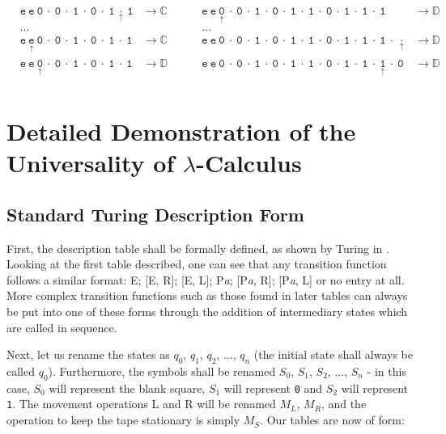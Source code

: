 \documentclass[Master.tex]{subfiles}
\begin{document}
\begin{equation*}
\begin{aligned}
&\mathtt{e\ e\ 0\ \cdot\ 0\ \cdot\ 1\ \cdot\ 0\ \cdot\ 1\ \underset{\uparrow}{\cdot}\ 1} & \rightarrow \mathbb{C}\ \ \ \ \ \ \ \ \ \ & \mathtt{e\ e\ \underset{\uparrow}{0}\ \cdot\ 0\ \cdot\ 1\ \cdot\ 0\ \cdot\ 1\ \cdot\ 1\ \cdot\ 0\ \cdot\ 1\ \cdot\ 1\ \cdot\ 1} & \rightarrow \mathbb{D}\\
&...& &...&\\
&\mathtt{e\ \underset{\uparrow}{e}\ 0\ \cdot\ 0\ \cdot\ 1\ \cdot\ 0\ \cdot\ 1\ \cdot\ 1} & \rightarrow \mathbb{C}\ \ \ \ \ \ \ \ \ \ & \mathtt{e\ e\ 0\ \cdot\ 0\ \cdot\ 1\ \cdot\ 0\ \cdot\ 1\ \cdot\ 1\ \cdot\ 0\ \cdot\ 1\ \cdot\ 1\ \cdot\ 1\ \cdot\ \underset{\uparrow}{\cdot}} & \rightarrow \mathbb{D}\\
&\mathtt{e\ e\ \underset{\uparrow}{0}\ \cdot\ 0\ \cdot\ 1\ \cdot\ 0\ \cdot\ 1\ \cdot\ 1} & \rightarrow \mathbb{D}\ \ \ \ \ \ \ \ \ \ & \mathtt{e\ e\ 0\ \cdot\ 0\ \cdot\ 1\ \cdot\ 0\ \cdot\ 1\ \cdot\ 1\ \cdot\ 0\ \cdot\ 1\ \cdot\ 1\ \cdot\ \underset{\uparrow}{1}\ \cdot\ 0} & \rightarrow \mathbb{D}\\
\end{aligned}
\end{equation*}

\clearpage


\section{Detailed Demonstration of the Universality of $\lambda$-Calculus}\label{appendix:lambdauniversaldemo}

\subsection{Standard Turing Description Form}

First, the description table shall be formally defined, as shown by Turing in \cite{turing1936computablenumbers}. Looking at the first table described, one can see that any transition function follows a similar format: E; [E, R]; [E, L]; P\textit{a}; [P\textit{a}, R]; [P\textit{a}, L] or no entry at all. More complex transition functions such as those found in later tables can always be put into one of these forms through the addition of intermediary states which are called in sequence.

Next, let us rename the states as $q_0$, $q_1$, $q_2$, $...$, $q_n$ (the initial state shall always be called $q_0$). Furthermore, the symbols shall be renamed $S_0$, $S_1$, $S_2$, $...$, $S_n$ - in this case, $S_0$ will represent the blank square, $S_1$ will represent \texttt{0} and $S_2$ will represent \texttt{1}. The movement operations L and R will be renamed $M_L$, $M_R$, and the operation to keep the tape stationary is simply $M_S$. Our tables are now of form:
\end{document}
